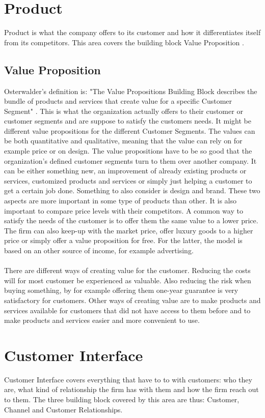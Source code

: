 \newpage
\section{Product}
Product is what the company offers to its customer and how it differentiates itself from its competitors. This area covers the building block Value Proposition \cite{osterwalderthesis}.

\subsection{Value Proposition}
Osterwalder's definition is: "The Value Propositions Building Block describes the bundle of products and services that create value for a specific Customer Segment" \cite{osterwalder}. This is what the organization actually offers to their customer or customer segments and are suppose to satisfy the customers needs. It might be different value propositions for the different Customer Segments. The values can be both quantitative and qualitative, meaning that the value can rely on for example price or on design. The value propositions have to be so good that the organization's defined customer segments turn to them over another company. It can be either something new, an improvement of already existing products or services, customized products and services or simply just helping a customer to get a certain job done. Something to also consider is design and brand. These two aspects are more important in some type of products than other. It is also important to compare price levels with their competitors. A common way to satisfy the needs of the customer is to offer them the same value to a lower price. The firm can also keep-up with the market price, offer luxury goods to a higher price or simply offer a value proposition for free. For the latter, the model is based on an other source of income, for example advertising. \\ \\
There are different ways of creating value for the customer. Reducing the costs will for most customer be experienced as valuable. Also reducing the risk when buying something, by for example offering them one-year guarantee is very satisfactory for customers. Other ways of creating value are to make products and services available for customers that did not have access to them before and to make products and services easier and more convenient to use. \cite{osterwalder}

\section{Customer Interface}
Customer Interface covers everything that have to to with customers: who they are, what kind of relationship the firm has with them and how the firm reach out to them. The three building block covered by this area are thus: Customer, Channel and Customer Relationships. \cite{osterwalderthesis}

